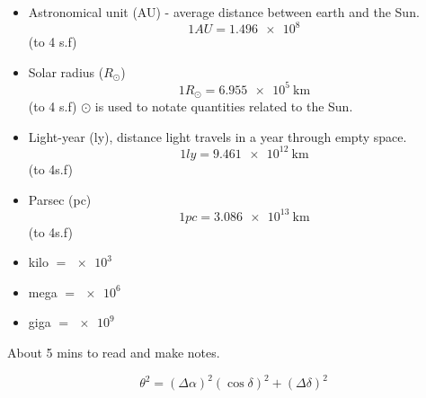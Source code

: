 \documentclass[a4paper]{tufte-handout}
\begin{document}

\begin{question}
\begin{itemize}
\item Astronomical unit (AU) - average distance between earth and the Sun.
\[1AU = \num{1.496e8} \]\hfill (to 4 s.f)

\item Solar radius ($R{_\odot}$)
\[1 R_{\odot} = \SI{6.955e5}{\km}\] \hfill (to 4 s.f)
$\odot$ is used to notate quantities related to the Sun.

\item Light-year (ly), distance light travels in a year through empty space.
\[1ly = \SI{9.461e12}{\km}\] \hfill (to 4s.f)

\item Parsec (pc)
\[1pc = \SI{3.086e13}{\km}\] \hfill (to 4s.f)

\item kilo $=\num{e3}$
\item mega $=\num{e6}$
\item giga $=\num{e9}$
\end{itemize}

About 5 mins to read and make notes.

\end{question}

\begin{question}
\[\theta^2 = (\Delta\alpha)^2(\cos\delta)^2 + (\Delta\delta)^2\]
\end{question}
\end{document}
